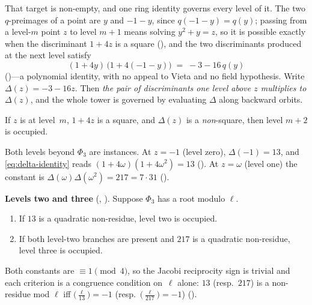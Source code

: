 That target is non-empty, and one ring identity governs every level of
it.  The two $q$-preimages of a point are $y$ and $-1-y$, since
$q(-1-y) = q(y)$; passing from a level-$m$ point $z$ to level $m+1$ means
solving $y^2+y=z$, so it is possible exactly when the discriminant $1+4z$
is a square
(),
and the two discriminants produced at the next level satisfy
\begin{equation}
\label{eq:delta-identity}
  (1+4y)\,\bigl(1+4(-1-y)\bigr) \;=\; -3 - 16\,q(y)
\end{equation}
()---a
polynomial identity, with no appeal to Vieta and no field hypothesis.
Write $\Delta(z) = -3-16z$.  Then \emph{the pair of discriminants one level
above $z$ multiplies to $\Delta(z)$}, and the whole tower is governed by
evaluating $\Delta$ along backward orbits.

\begin{theorem}
\label{thm:level-lift}
If $z$ is at level~$m$, $1+4z$ is a square, and $\Delta(z)$ is a
\emph{non}-square, then level $m+2$ is occupied.
\end{theorem}

\noindent
Both levels beyond $\Phi_3$ are instances.  At $z = -1$ (level zero),
$\Delta(-1) = 13$, and \eqref{eq:delta-identity} reads
$(1+4\omega)(1+4\omega^{2}) = 13$
().
At $z = \omega$ (level one) the constant is
$\Delta(\omega)\Delta(\omega^{2}) = 217 = 7\cdot 31$
().

\begin{keyresult}
\textbf{Levels two and three}
(,
 ).
Suppose $\Phi_3$ has a root modulo $\ell$.
\begin{enumerate}[nosep,leftmargin=*]
\item If $13$ is a quadratic non-residue, level two is occupied.
\item If both level-two branches are present and $217$ is a quadratic
  non-residue, level three is occupied.
\end{enumerate}
Both constants are $\equiv 1 \pmod 4$, so the Jacobi reciprocity sign is
trivial and each criterion is a congruence condition on~$\ell$ alone:
$13$ (resp.\ $217$) is a non-residue mod $\ell$ iff
$\bigl(\tfrac{\ell}{13}\bigr) = -1$ (resp.\ $\bigl(\tfrac{\ell}{217}\bigr) = -1$)
().
\end{keyresult}

